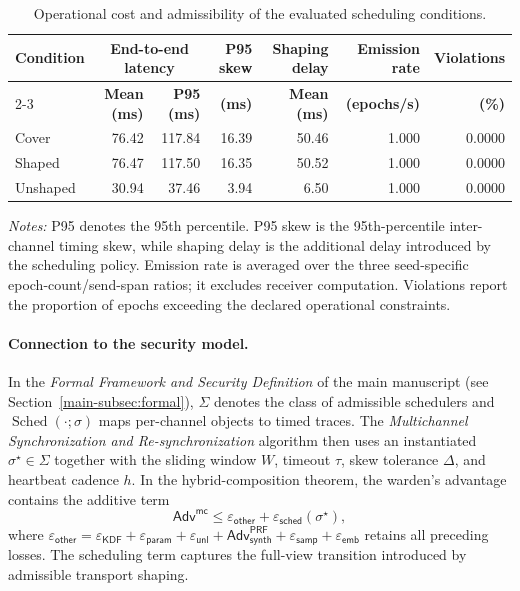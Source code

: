 \documentclass[journal]{IEEEtran}
\renewcommand{\arraystretch}{1.2}
\renewcommand{\arraystretch}{1.0}
\theoremstyle{definition}
\theoremstyle{game}
\renewcommand{\arraystretch}{1.5}
\begin{document}
\begin{table}[!t]
\centering
\caption[Operational cost and scheduler admissibility.]
{Operational cost and admissibility of the evaluated scheduling conditions.}
\label{tab:scheduling_cost}
\small
\setlength{\tabcolsep}{5.0pt}
\renewcommand{\arraystretch}{1.15}
\begin{threeparttable}
\begin{tabular}{@{}lrrrrrr@{}}
\toprule
\textbf{Condition} &
\multicolumn{2}{c}{\textbf{End-to-end latency}} &
\textbf{P95 skew} &
\textbf{Shaping delay} &
\textbf{Emission rate} &
\textbf{Violations} \\
\cmidrule(lr){2-3}
& \textbf{Mean (ms)}
& \textbf{P95 (ms)}
& \textbf{(ms)}
& \textbf{Mean (ms)}
& \textbf{(epochs/s)}
& \textbf{(\%)} \\
\midrule
Cover    & 76.42 & 117.84 & 16.39 & 50.46 & 1.000 & 0.0000 \\
Shaped   & 76.47 & 117.50 & 16.35 & 50.52 & 1.000 & 0.0000 \\
Unshaped & 30.94 &  37.46 &  3.94 &  6.50 & 1.000 & 0.0000 \\
\bottomrule
\end{tabular}
\begin{tablenotes}
\footnotesize
\item \textit{Notes:} P95 denotes the 95th percentile. P95 skew is the 95th-percentile inter-channel timing skew, while shaping delay is the additional delay introduced by the scheduling policy. Emission rate is averaged over the three seed-specific epoch-count/send-span
ratios; it excludes receiver computation. Violations report the proportion of
epochs exceeding the declared operational constraints.
\end{tablenotes}
\end{threeparttable}
\end{table}

\paragraph{Connection to the security model.}
In the \emph{Formal Framework and Security Definition} of the main manuscript (see Section~\ref{main-subsec:formal}), $\Sigma$ denotes the class of admissible schedulers and
$\operatorname{Sched}(\cdot;\sigma)$ maps per-channel objects to timed
traces. The \emph{Multichannel Synchronization and
Re-synchronization} algorithm then uses an instantiated
$\sigma^\star\in\Sigma$ together with the sliding window $W$, timeout
$\tau$, skew tolerance $\Delta$, and heartbeat cadence $h$. In the
hybrid-composition theorem, the warden's advantage contains the
additive term
\begin{equation}
\mathsf{Adv}^{\mathsf{mc}}\le\varepsilon_{\mathsf{other}}
 +\varepsilon_{\mathsf{sched}}(\sigma^\star),
\label{eq:supp_sched_theory_link}
\end{equation}
where $\varepsilon_{\mathsf{other}}=\varepsilon_{\mathsf{KDF}}+
\varepsilon_{\mathsf{param}}+\varepsilon_{\mathsf{unl}}+
\mathsf{Adv}^{\mathsf{PRF}}_{\mathsf{synth}}+\varepsilon_{\mathsf{samp}}+
\varepsilon_{\mathsf{emb}}$ retains all preceding losses.
The scheduling term captures the full-view transition introduced by admissible transport shaping.
\end{document}
